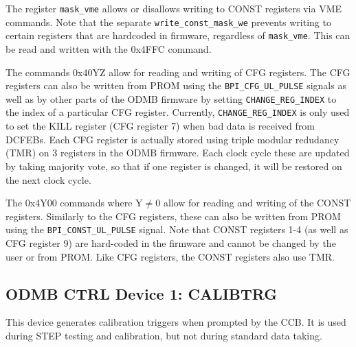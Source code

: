 \documentclass[10pt,a4paper]{article}
\begin{document}
The register \texttt{mask\_vme} allows or disallows writing to CONST registers via VME commands. Note that the separate \texttt{write\_const\_mask\_we} prevents writing to certain registers that are hardcoded in firmware, regardless of \texttt{mask\_vme}. This can be read and written with the 0x4FFC command.

The commands 0x40YZ allow for reading and writing of CFG registers. The CFG registers can also be written from PROM using the \texttt{BPI\_CFG\_UL\_PULSE} signals as well as by other parts of the ODMB firmware by setting \texttt{CHANGE\_REG\_INDEX} to the index of a particular CFG register. Currently, \texttt{CHANGE\_REG\_INDEX} is only used to set the KILL register (CFG register 7) when bad data is received from DCFEBs. Each CFG register is actually stored using triple modular redudancy (TMR) on 3 registers in the ODMB firmware. Each clock cycle these are updated by taking majority vote, so that if one register is changed, it will be restored on the next clock cycle. 

The 0x4Y00 commands where Y$\neq 0$ allow for reading and writing of the CONST registers. Similarly to the CFG registers, these can also be written from PROM using the \texttt{BPI\_CONST\_UL\_PULSE} signal. Note that CONST registers 1-4 (as well as CFG register 9) are hard-coded in the firmware and cannot be changed by the user or from PROM. Like CFG registers, the CONST registers also use TMR.

\subsection{ODMB CTRL Device 1: CALIBTRG}

This device generates calibration triggers when prompted by the CCB. It is used during STEP testing and calibration, but not during standard data taking. 
\end{document}
